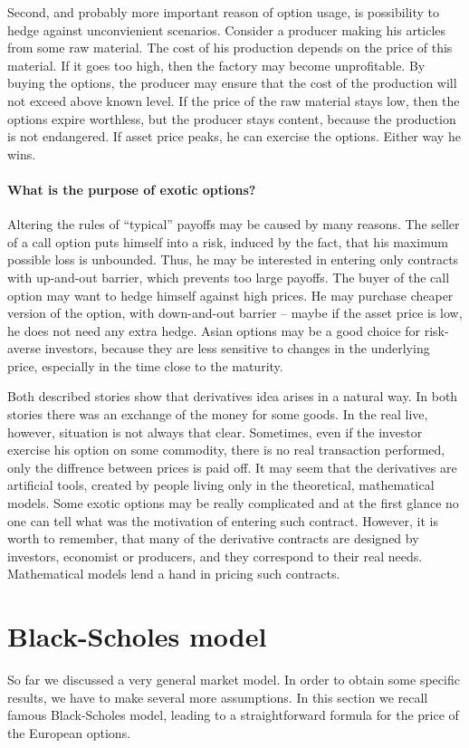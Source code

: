 \documentclass[a4paper,11pt, twoside]{book}
\theoremstyle{definition}
\theoremstyle{remark}
\begin{document}
Second, and probably more important reason of option usage, is possibility to hedge against unconvienient scenarios. Consider a producer making his articles from some raw material. The cost of his production depends on the price of this material. If it goes too high, then the factory may become unprofitable. By buying the options, the producer may ensure that the cost of the production will not exceed above known level. If the price of the raw material stays low, then the options expire worthless, but the producer stays content, because the production is not endangered. If asset price peaks, he can exercise the options. Either way he wins.


\paragraph{What is the purpose of exotic options?}
Altering the rules of ``typical'' payoffs may be caused by many reasons. The seller of a call option puts himself into a risk, induced by the fact, that his maximum possible loss is unbounded. Thus, he may be interested in entering only contracts with up-and-out barrier, which prevents too large payoffs. The buyer of the call option may want to hedge himself against high prices.
He may purchase cheaper version of the option, with down-and-out  barrier -- maybe if the asset price is low, he does not need any extra hedge. Asian options may be a good choice for risk-averse investors, because they are less sensitive to changes in the underlying price, especially in the time close to the maturity.

Both described stories show that derivatives idea arises in a natural way. In both stories there was an exchange of the money for some goods. In the real live, however, situation is not always that clear. Sometimes, even if the investor exercise his option on some commodity, there is no real transaction performed, only the diffrence between prices is paid off.
It may seem that the derivatives are artificial tools, created by people living only in the theoretical, mathematical models. Some exotic options may be really complicated and at the first glance no one can tell what was the motivation of entering such contract. However, it is worth to remember, that many of the derivative contracts are designed by investors, economist or producers, and they correspond to their real needs. Mathematical models lend a hand in pricing such contracts.


\section{Black-Scholes model}
\label{sec:blackScholes}
So far we discussed a very general market model. In order to obtain some specific results, we have to make several more assumptions.
In this section we recall famous Black-Scholes model, leading to a straightforward formula for the price of the European options.
\end{document}
